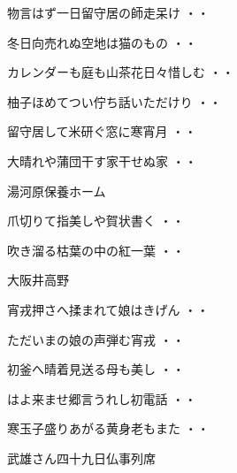 \begin{shiika}物言はず一日留守居の師走呆け
\hfill{・・}\end{shiika}
\begin{shiika}冬日向売れぬ空地は猫のもの
\hfill{・・}\end{shiika}
\begin{shiika}カレンダーも庭も山茶花日々惜しむ
\hfill{・・}\end{shiika}
\begin{shiika}柚子ほめてつい佇ち話いただけり
\hfill{・・}\end{shiika}
\begin{shiika}留守居して米研ぐ窓に寒宵月
\hfill{・・}\end{shiika}
\begin{shiika}大晴れや蒲団干す家干せぬ家
\hfill{・・}\end{shiika}
\vspace{0.6cm}
湯河原保養ホーム
\begin{shiika}爪切りて指美しや賀状書く
\hfill{・・}\end{shiika}
\begin{shiika}吹き溜る枯葉の中の紅一葉
\hfill{・・}\end{shiika}
\vspace{0.6cm}
大阪井高野
\begin{shiika}宵戎押さへ揉まれて娘はきげん
\hfill{・・}\end{shiika}
\begin{shiika}ただいまの娘の声弾む宵戎
\hfill{・・}\end{shiika}
\begin{shiika}初釜へ晴着見送る母も美し
\hfill{・・}\end{shiika}
\begin{shiika}はよ来ませ郷言うれし初電話
\hfill{・・}\end{shiika}
\begin{shiika}寒玉子盛りあがる黄身老もまた
\hfill{・・}\end{shiika}
\vspace{0.6cm}
武雄さん四十九日仏事列席
